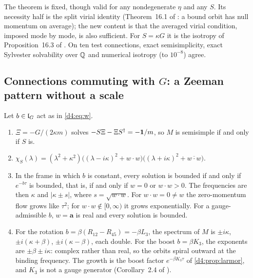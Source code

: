 The theorem is fixed, though valid for any nondegenerate $\eta$ and any $S$. Its necessity half is the split virial identity (Theorem~16.1
of \cite{ES17}: a bound orbit has null momentum on average); the new content is that the averaged virial condition, imposed mode by mode,
is also sufficient. For $S=\kappa G$ it is the isotropy of Proposition~16.3 of \cite{ES17}. On ten test connections, exact semisimplicity,
exact Sylvester solvability over $\mathbb{Q}$ and numerical isotropy (to $10^{-8}$) agree.

\subsection{\texorpdfstring{Connections commuting with $G$: a Zeeman pattern without a scale}{Connections commuting with G: a Zeeman pattern without a scale}}
\label{d4:sec:lG}

\begin{theorem}
\label{d4:thm:lG}
Let $b\in\mathfrak l_G$ act as in \eqref{d4:eq:w}.
\begin{enumerate}[label=(\roman*),leftmargin=2.2em]
\item $\Xi=-G/(2\kappa m)$ solves $-S\Xi-\Xi S^\dagger=-\mathbf 1/m$, so $M$ is semisimple if and only if $S$ is.
\item $\chi_S(\lambda)=(\lambda^2+\kappa^2)\bigl((\lambda-i\kappa)^2+w\cdot w\bigr)\bigl((\lambda+i\kappa)^2+\overline{w\cdot w}\bigr)$.
\item In the frame in which $b$ is constant, every solution is bounded if and only if $e^{-b\tau}$ is bounded, that is, if and only if $w=0$ or
$w\cdot w>0$. The frequencies are then $\kappa$ and $|\kappa\pm s|$, where $s=\sqrt{w\cdot w}$. For $w\cdot w=0\neq w$ the zero-momentum flow
grows like $\tau^2$; for $w\cdot w\notin[0,\infty)$ it grows exponentially. For a gauge-admissible $b$, $w=\mathbf a$ is real and every
solution is bounded.
\item For the rotation $b=\beta(R_{12}-R_{45})=-\beta L_3$, the spectrum of $M$ is $\pm i\kappa$, $\pm i(\kappa+\beta)$, $\pm i(\kappa-\beta)$, each
double. For the boost $b=\beta K_3$, the exponents are $\pm\beta\pm i\kappa$: complex rather than real, so the orbits spiral outward at the binding
frequency. The growth is the boost factor $e^{-\beta K_3\tau}$ of \cref{d4:prop:larmor}, and $K_3$ is not a gauge generator (Corollary~2.4 of
\cite{ES17}).
\end{enumerate}
\end{theorem}

